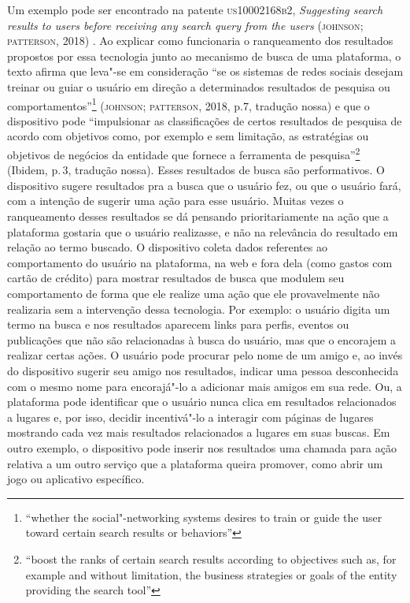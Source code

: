 Um exemplo pode ser encontrado na patente \textsc{us10002168b2}, \emph{Suggesting
search results to users before receiving any search query from the
users} (\textsc{johnson}; \textsc{patterson}, 2018) . Ao explicar como funcionaria o
ranqueamento dos resultados propostos por essa tecnologia junto ao
mecanismo de busca de uma plataforma, o texto afirma que leva"-se em
consideração ``se os sistemas de redes sociais desejam treinar ou guiar
o usuário em direção a determinados resultados de pesquisa ou
comportamentos''\footnote{``whether the social"-networking systems
  desires to train or guide the user toward certain search results or
  behaviors''} (\textsc{johnson}; \textsc{patterson}, 2018, p.7, tradução nossa) e que o
dispositivo pode ``impulsionar as classificações de certos resultados de
pesquisa de acordo com objetivos como, por exemplo e sem limitação, as
estratégias ou objetivos de negócios da entidade que fornece a
ferramenta de pesquisa''\footnote{``boost the ranks of certain search
  results according to objectives such as, for example and without
  limitation, the business strategies or goals of the entity providing
  the search tool''} (Ibidem, p.\,3, tradução nossa). Esses resultados de
busca são performativos. O dispositivo sugere resultados pra a busca que
o usuário fez, ou que o usuário fará, com a intenção de sugerir uma ação
para esse usuário. Muitas vezes o ranqueamento desses resultados se dá
pensando prioritariamente na ação que a plataforma gostaria que o
usuário realizasse, e não na relevância do resultado em relação ao termo
buscado. O dispositivo coleta dados referentes ao comportamento do
usuário na plataforma, na web e fora dela (como gastos com cartão de
crédito) para mostrar resultados de busca que modulem seu comportamento
de forma que ele realize uma ação que ele provavelmente não realizaria
sem a intervenção dessa tecnologia. Por exemplo: o usuário digita um
termo na busca e nos resultados aparecem links para perfis, eventos ou
publicações que não são relacionadas à busca do usuário, mas que o
encorajem a realizar certas ações. O usuário pode procurar pelo nome de
um amigo e, ao invés do dispositivo sugerir seu amigo nos resultados,
indicar uma pessoa desconhecida com o mesmo nome para encorajá"-lo a
adicionar mais amigos em sua rede. Ou, a plataforma pode identificar que
o usuário nunca clica em resultados relacionados a lugares e, por isso,
decidir incentivá"-lo a interagir com páginas de lugares mostrando cada
vez mais resultados relacionados a lugares em suas buscas. Em outro
exemplo, o dispositivo pode inserir nos resultados uma chamada para ação
relativa a um outro serviço que a plataforma queira promover, como abrir
um jogo ou aplicativo específico.

